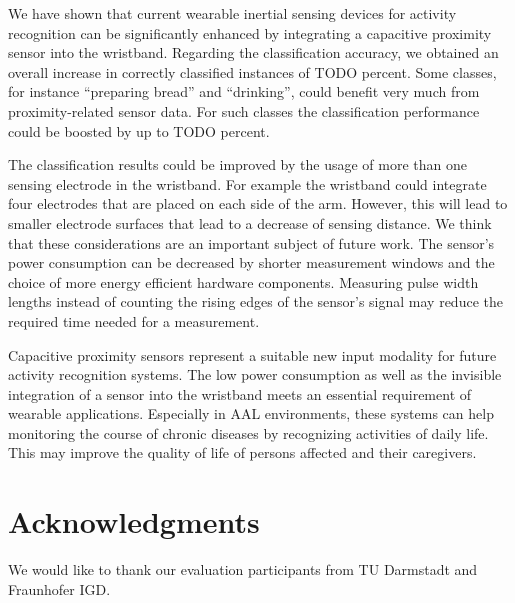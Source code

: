 \documentclass[runningheads,a4paper]{llncs}
\begin{document}
We have shown that current wearable inertial sensing devices for activity recognition can be significantly enhanced by integrating a capacitive proximity sensor into the wristband. Regarding the classification accuracy, we obtained an overall increase in correctly classified instances of TODO percent. Some classes, for instance ``preparing bread'' and ``drinking'', could benefit very much from proximity-related sensor data. For such classes the classification performance could be boosted by up to TODO percent. 

The classification results could be improved by the usage of more than one sensing electrode in the wristband. For example the wristband could integrate four electrodes that are placed on each side of the arm. However, this will lead to smaller electrode surfaces that lead to a decrease of sensing distance. We think that these considerations are an important subject of future work. The sensor's power consumption can be decreased by shorter measurement windows and the choice of more energy efficient hardware components. Measuring pulse width lengths instead of counting the rising edges of the sensor's signal may reduce the required time needed for a measurement.

Capacitive proximity sensors represent a suitable new input modality for future activity recognition systems. The low power consumption as well as the invisible integration of a sensor into the wristband meets an essential requirement of wearable applications. Especially in AAL environments, these systems can help monitoring the course of chronic diseases by recognizing activities of daily life. This may improve the quality of life of persons affected and their caregivers. 

\section*{Acknowledgments}

We would like to thank our evaluation participants from TU Darmstadt and Fraunhofer IGD.




\end{document}
